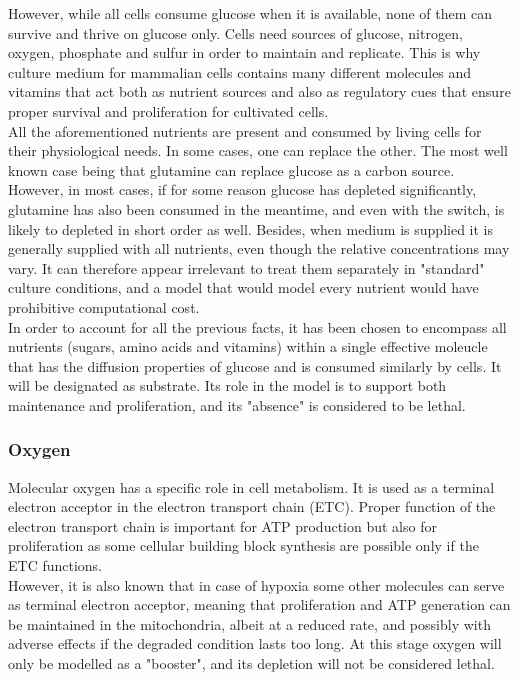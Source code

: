 \documentclass[11pt,a4paper]{article}
\begin{document}
However, while all cells consume glucose when it is available, none of them can survive and thrive on glucose only. Cells need sources of glucose, nitrogen, oxygen, phosphate and sulfur in order to maintain and replicate.\cite{Cooper2006}\cite{Spinelli2021} This is why culture medium for mammalian cells contains many different molecules and vitamins that act both as nutrient sources and also as regulatory cues that ensure proper survival and proliferation for cultivated cells.\\

All the aforementioned nutrients are present and consumed by living cells for their physiological needs. In some cases, one can replace the other. The most well known case being that glutamine can replace glucose as a carbon source.\cite{Stuart2023}\cite{Mazurek1997} However, in most cases, if for some reason glucose has depleted significantly, glutamine has also been consumed in the meantime, and even with the switch, is likely to depleted in short order as well. Besides, when medium is supplied it is generally supplied with all nutrients, even though the relative concentrations may vary. It can therefore appear irrelevant to treat them separately in "standard" culture conditions, and a model that would model every nutrient would have prohibitive computational cost.\\

In order to account for all the previous facts, it has been chosen to encompass all nutrients (sugars, amino acids and vitamins) within a single effective moleucle that has the diffusion properties of glucose and is consumed similarly by cells. It will be designated as substrate. Its role in the model is to support both maintenance and proliferation, and its "absence" is considered to be lethal.\\

\subsubsection{Oxygen}
Molecular oxygen has a specific role in cell metabolism. It is used as a terminal electron acceptor in the electron transport chain (ETC). Proper function of the electron transport chain is important for ATP production but also for proliferation as some cellular building block synthesis are possible only if the ETC functions.\cite{Martinez2020}\\

However, it is also known that in case of hypoxia some other molecules can serve as terminal electron acceptor, meaning that proliferation and ATP generation can be maintained in the mitochondria, albeit at a reduced rate, and possibly with adverse effects if the degraded condition lasts too long.\cite{Spinelli2021} At this stage oxygen will only be modelled as a "booster", and its depletion will not be considered lethal.\\
\end{document}
